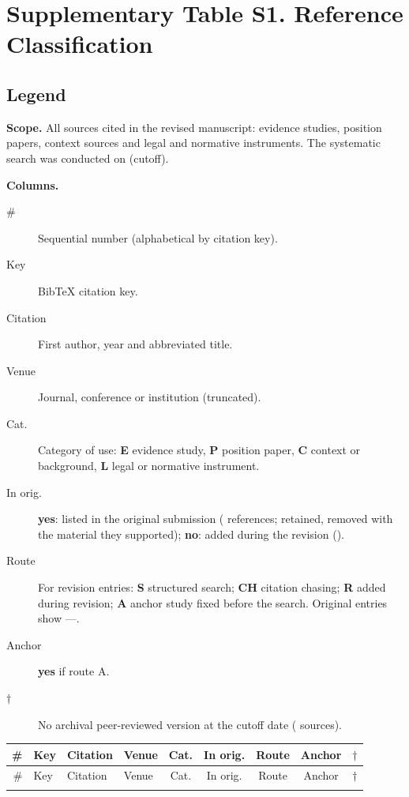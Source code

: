 \documentclass[a4paper,10pt]{article}
\begin{document}
\section*{Supplementary Table S1. Reference Classification}

\subsection*{Legend}

\noindent\textbf{Scope.}
All \Ncited{} sources cited in the revised manuscript: \Nevidence{} evidence studies,
\Nposition{} position papers, \Ncontext{} context sources and \Nlegal{} legal and normative instruments.
The systematic search was conducted on \cutoffdate{} (cutoff).

\smallskip
\noindent\textbf{Columns.}
\begin{description}
\item[\#] Sequential number (alphabetical by citation key).
\item[Key] BibTeX citation key.
\item[Citation] First author, year and abbreviated title.
\item[Venue] Journal, conference or institution (truncated).
\item[Cat.] Category of use: \textbf{E} evidence study, \textbf{P} position paper, \textbf{C} context or background, \textbf{L} legal or normative instrument.
\item[In orig.] \textbf{yes}: listed in the original submission (\NorigCited{} references; \NorigYes{} retained, \NorigRemoved{} removed with the material they supported); \textbf{no}: added during the revision (\NorigNo{}).
\item[Route] For revision entries: \textbf{S} structured search; \textbf{CH} citation chasing; \textbf{R} added during revision; \textbf{A} anchor study fixed before the search. Original entries show ---.
\item[Anchor] \textbf{yes} if route A.
\item[$\dagger$] No archival peer-reviewed version at the cutoff date (\Nnonarchival{} sources).
\end{description}

\medskip
\begingroup
\small
\begin{longtable}{@{}rlp{5.2cm}p{2.8cm}cccc c@{}}
\toprule
\# & Key & Citation & Venue & Cat. & In orig. & Route & Anchor & $\dagger$ \\
\midrule
\endfirsthead
\toprule
\# & Key & Citation & Venue & Cat. & In orig. & Route & Anchor & $\dagger$ \\
\midrule
\endhead
\bottomrule
\endfoot

\end{longtable}
\endgroup
\end{document}
